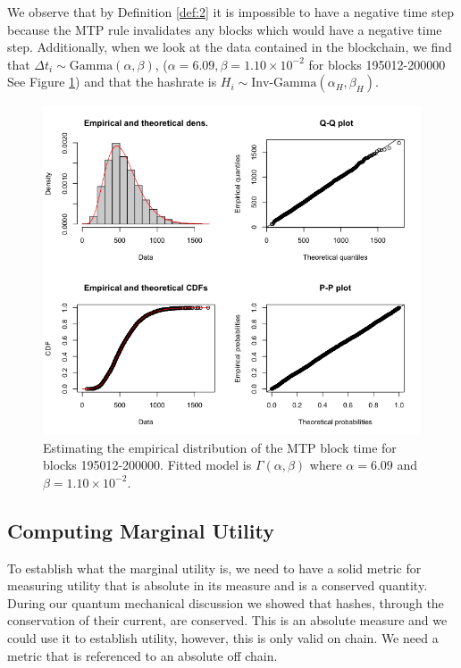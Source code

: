 \documentclass[runningheads]{llncs}
\begin{document}
We observe that by Definition \ref{def:2} it is impossible to have a negative time step because the MTP rule invalidates any blocks which would have a negative time step.
Additionally, when we look at the data contained in the blockchain, we find that $\Delta t_i \sim \mbox{Gamma}(\alpha, \beta)$, ($\alpha = 6.09, \beta = 1.10\times 10^{-2}$ for blocks 195012-200000 See Figure \ref{fig:4}) and that the hashrate is $H_i \sim \mbox{Inv-Gamma}(\alpha_H, \beta_H)$.
\begin{figure}
    \includegraphics[width=\textwidth]{Block MTP Empirical Distribution Fit.png}
    \caption{
        Estimating the empirical distribution of the MTP block time for blocks 195012-200000.
        Fitted model is $\Gamma(\alpha,\beta)$ where $\alpha = 6.09$ and $\beta = 1.10\times 10^{-2}$.
    }\label{fig:4}
\end{figure}

\subsection{Computing Marginal Utility}
To establish what the marginal utility is, we need to have a solid metric for measuring utility that is absolute in its measure and is a conserved quantity.
During our quantum mechanical discussion we showed that  hashes, through the conservation of their current, are conserved.
This is an absolute measure and we could use it to establish utility, however, this is only valid on chain.
We need a metric that is referenced to an absolute off chain.
\end{document}
